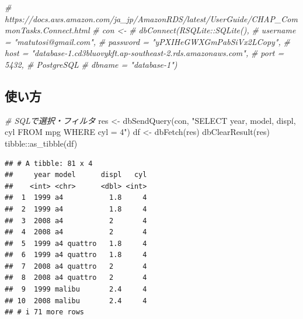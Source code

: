 \documentclass[
]{article}
\newenvironment{Shaded}{\begin{snugshade}}{\end{snugshade}}
\newcommand{\CommentTok}[1]{\textcolor[rgb]{0.56,0.35,0.01}{\textit{#1}}}
\newcommand{\FunctionTok}[1]{\textcolor[rgb]{0.00,0.00,0.00}{#1}}
\newcommand{\NormalTok}[1]{#1}
\newcommand{\OtherTok}[1]{\textcolor[rgb]{0.56,0.35,0.01}{#1}}
\newcommand{\SpecialCharTok}[1]{\textcolor[rgb]{0.00,0.00,0.00}{#1}}
\newcommand{\StringTok}[1]{\textcolor[rgb]{0.31,0.60,0.02}{#1}}
\begin{document}
\begin{Shaded}
\begin{Highlighting}[]
  \CommentTok{\# https://docs.aws.amazon.com/ja\_jp/AmazonRDS/latest/UserGuide/CHAP\_CommonTasks.Connect.html}
  \CommentTok{\# con \textless{}{-} }
  \CommentTok{\#   dbConnect(RSQLite::SQLite(), }
  \CommentTok{\#   username = "matutosi@gmail.com",}
  \CommentTok{\#   password = "yPXIHeGWXGmPabSiVx2LCopy",}
  \CommentTok{\#   host = "database{-}1.cd3bluovykft.ap{-}southeast{-}2.rds.amazonaws.com", }
  \CommentTok{\#   port = 5432, \# PostgreSQL}
  \CommentTok{\#   dbname = "database{-}1")}
\end{Highlighting}
\end{Shaded}

\hypertarget{ux4f7fux3044ux65b9-2}{%
\subsection{使い方}\label{ux4f7fux3044ux65b9-2}}

\begin{Shaded}
\begin{Highlighting}[]
  \CommentTok{\# SQLで選択・フィルタ}
\NormalTok{res }\OtherTok{\textless{}{-}} \FunctionTok{dbSendQuery}\NormalTok{(con, }\StringTok{"SELECT year, model, displ, cyl FROM mpg WHERE cyl = 4"}\NormalTok{)}
\NormalTok{df }\OtherTok{\textless{}{-}} \FunctionTok{dbFetch}\NormalTok{(res)}
\FunctionTok{dbClearResult}\NormalTok{(res)}
\NormalTok{tibble}\SpecialCharTok{::}\FunctionTok{as\_tibble}\NormalTok{(df)}
\end{Highlighting}
\end{Shaded}

\begin{verbatim}
## # A tibble: 81 x 4
##     year model      displ   cyl
##    <int> <chr>      <dbl> <int>
##  1  1999 a4           1.8     4
##  2  1999 a4           1.8     4
##  3  2008 a4           2       4
##  4  2008 a4           2       4
##  5  1999 a4 quattro   1.8     4
##  6  1999 a4 quattro   1.8     4
##  7  2008 a4 quattro   2       4
##  8  2008 a4 quattro   2       4
##  9  1999 malibu       2.4     4
## 10  2008 malibu       2.4     4
## # i 71 more rows
\end{verbatim}
\end{document}
